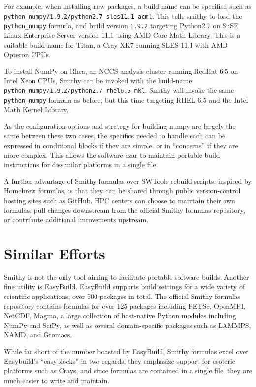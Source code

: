 \documentclass{acm_proc_article-sp}
\begin{document}
For example, when installing new packages, a build-name can be specified such as
\texttt{python\_numpy/1.9.2/python2.7\_sles11.1\_acml}. This tells smithy to
load the \texttt{python\_numpy} formula, and build version \texttt{1.9.2}
targeting Python2.7 on SuSE Linux Enterprise Server version 11.1 using AMD Core
Math Library. This is a suitable build-name for Titan, a Cray XK7 running SLES
11.1 with AMD Opteron CPUs.

To install NumPy on Rhea, an NCCS analysis cluster running RedHat 6.5 on Intel
Xeon CPUs, Smithy can be invoked with the build-name
\texttt{python\_numpy/1.9.2/python2.7\_rhel6.5\_mkl}. Smithy will invoke the
same \texttt{python\_numpy} formula as before, but this time targeting RHEL 6.5
and the Intel Math Kernel Library.

As the configuration options and strategy for building numpy are largely the
same between these two cases, the specifics needed to handle each can be
expressed in conditional blocks if they are simple, or in ``concerns'' if they
are more complex. This allows the software czar to maintain portable build
instructions for dissimilar platforms in a single file.

A further advantage of Smithy formulas over SWTools rebuild scripts, inspired by
Homebrew formulas, is that they can be shared through public version-control
hosting sites such as GitHub. HPC centers can choose to maintain their own
formulas, pull changes downstream from the official Smithy formulas repository,
or contribute additional imrovements upstream.

\section{Similar Efforts}

Smithy is not the only tool aiming to facilitate portable software builds.
Another fine utility is EasyBuild\cite{EasyBuild}. EasyBuild supports build
settings for a wide variety of scientific applications, over 500 packages in
total. The official Smithy formulas repository contains formulas for over 125
packages including PETSc, OpenMPI, NetCDF, Magma, a large collection of
host-native Python modules including NumPy and SciPy, as well as several
domain-specific packages such as LAMMPS, NAMD, and Gromacs.

While far short of the number boasted by EasyBuild, Smithy formulas excel over
Easybuild's ``easyblocks'' in two regards: they emphasize support for esoteric
platforms such as Crays, and since formulas are contained in a single file, they
are much easier to write and maintain.
\end{document}
